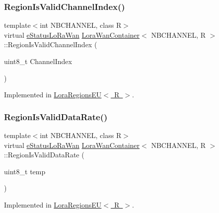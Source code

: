 \subsubsection{\texorpdfstring{Region\+Is\+Valid\+Channel\+Index()}{RegionIsValidChannelIndex()}}
{\footnotesize\ttfamily template$<$int N\+B\+C\+H\+A\+N\+N\+EL, class R$>$ \\
virtual \mbox{\hyperlink{_define_8h_a1cea710adbbf5b02bced8f79cd82f7b9}{e\+Status\+Lo\+Ra\+Wan}} \mbox{\hyperlink{class_lora_wan_container}{Lora\+Wan\+Container}}$<$ N\+B\+C\+H\+A\+N\+N\+EL, R $>$\+::Region\+Is\+Valid\+Channel\+Index (\begin{DoxyParamCaption}\item[{uint8\+\_\+t}]{Channel\+Index }\end{DoxyParamCaption})\hspace{0.3cm}{\ttfamily [pure virtual]}}



Implemented in \mbox{\hyperlink{class_lora_regions_e_u_a265374672b836ead15fe670d9207bf4e}{Lora\+Regions\+E\+U$<$ R $>$}}.

\mbox{\label{class_lora_wan_container_aeec0ea6c3979df30b2d9b27bdb8ea043}} 
\subsubsection{\texorpdfstring{Region\+Is\+Valid\+Data\+Rate()}{RegionIsValidDataRate()}}
{\footnotesize\ttfamily template$<$int N\+B\+C\+H\+A\+N\+N\+EL, class R$>$ \\
virtual \mbox{\hyperlink{_define_8h_a1cea710adbbf5b02bced8f79cd82f7b9}{e\+Status\+Lo\+Ra\+Wan}} \mbox{\hyperlink{class_lora_wan_container}{Lora\+Wan\+Container}}$<$ N\+B\+C\+H\+A\+N\+N\+EL, R $>$\+::Region\+Is\+Valid\+Data\+Rate (\begin{DoxyParamCaption}\item[{uint8\+\_\+t}]{temp }\end{DoxyParamCaption})\hspace{0.3cm}{\ttfamily [pure virtual]}}



Implemented in \mbox{\hyperlink{class_lora_regions_e_u_aeb59fccca463d845279c448a6fa46548}{Lora\+Regions\+E\+U$<$ R $>$}}.

